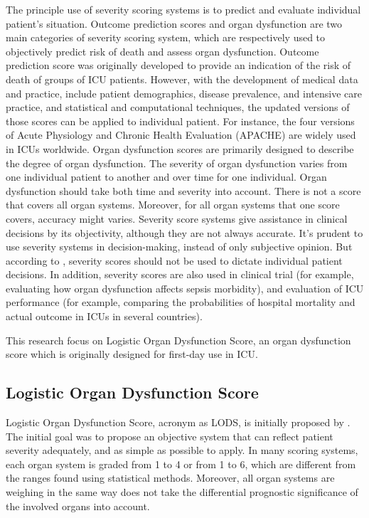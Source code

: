 \documentclass[12pt,a4paper,english
]{tunithesis}
\begin{document}
The principle use of severity scoring systems is to predict and evaluate individual patient's situation. Outcome prediction scores and organ dysfunction are two main categories of severity scoring system, which are respectively used to objectively predict risk of death and assess organ dysfunction. Outcome prediction score was originally developed to provide an indication of the risk of death of groups of ICU patients. However, with the development of medical data and practice, include patient demographics, disease prevalence, and intensive care practice, and statistical and computational techniques, the updated versions of those scores can be applied to individual patient. For instance, the four versions of Acute Physiology and Chronic Health Evaluation (APACHE)  are widely used in ICUs worldwide. Organ dysfunction scores are primarily designed to describe the degree of organ dysfunction. The severity of organ dysfunction varies from one individual patient to another and over time for one individual. Organ dysfunction should take both time and severity into account. There is not a score that covers all organ systems. Moreover, for all organ systems that one score covers, accuracy might varies. \parencite{LeGall2005, Bouch2008, Vincent2010} Severity score systems give assistance in clinical decisions by its objectivity, although they are not always accurate. It's prudent to use severity systems in decision-making, instead of only subjective opinion. But according to \textcite{LeGall2005, Vincent2010-at}, severity scores should not be used to dictate individual patient decisions. In addition, severity scores are also used in clinical trial (for example, evaluating how organ dysfunction affects sepsis morbidity), and evaluation of ICU performance (for example, comparing the probabilities of hospital mortality and actual outcome in ICUs in several countries). \parencite{LeGall2005, Vincent2010}

This research focus on Logistic Organ Dysfunction Score, an organ dysfunction score which is originally designed for first-day use in ICU.

\subsection{Logistic Organ Dysfunction Score}
Logistic Organ Dysfunction Score, acronym as LODS, is initially proposed by \textcite{legall96}. The initial goal was to propose an objective system that can reflect  patient severity adequately, and as simple as possible to apply.  In many scoring systems, each organ system is graded from 1 to 4 or from 1 to 6, which are different from the ranges found using statistical methods. Moreover, all organ systems are weighing in the same way does not take the differential prognostic significance of the involved organs into account. 
\end{document}
